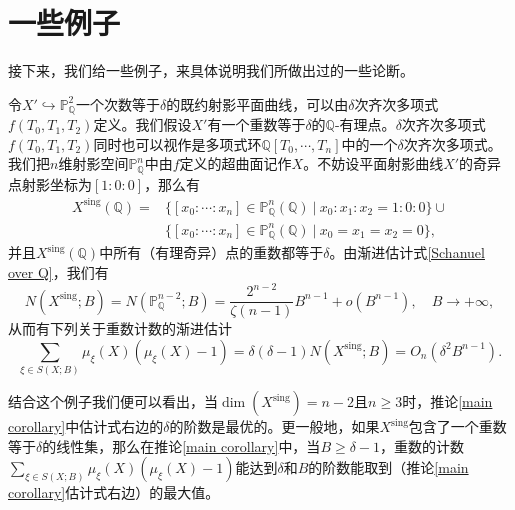 \section{一些例子}

接下来，我们给一些例子，来具体说明我们所做出过的一些论断。

\begin{example} \label{cylinder}
令$X'\hookrightarrow\mathbb P^2_{\mathbb{Q}}$一个次数等于$\delta$的既约射影平面曲线，可以由$\delta$次齐次多项式$f(T_0,T_1,T_2)$定义。我们假设$X'$有一个重数等于$\delta$的${\mathbb{Q}}$-有理点。$\delta$次齐次多项式$f(T_0,T_1,T_2)$同时也可以视作是多项式环${\mathbb{Q}}[T_0,\cdots,T_n]$中的一个$\delta$次齐次多项式。我们把$n$维射影空间$\mathbb P^n_{\mathbb{Q}}$中由$f$定义的超曲面记作$X$。不妨设平面射影曲线$X'$的奇异点射影坐标为$[1:0:0]$，那么有
\begin{align}
X^{\mathrm{sing}}(\mathbb{Q}) = & \{[x_0:\cdots:x_n] \in \mathbb{P}^n_{\mathbb{Q}}(\mathbb{Q}) \ |\ x_0:x_1:x_2 = 1:0:0 \} \cup \nonumber\\
& \{[x_0:\cdots:x_n] \in \mathbb{P}^n_{{\mathbb{Q}}}({\mathbb{Q}}) \ |\ x_0=x_1=x_2=0\},
\end{align}
并且$X^{\mathrm{sing}}(\mathbb{Q})$中所有（有理奇异）点的重数都等于$\delta$。由渐进估计式\eqref{Schanuel over Q}，我们有
\begin{equation}
N(X^{\mathrm{sing}};B) = N(\mathbb{P}^{n-2}_{\mathbb{Q}};B) = \frac{2^{n-2}}{\zeta(n-1)} B^{n-1} + o(B^{n-1}), \quad B \rightarrow +\infty,
\end{equation}
从而有下列关于重数计数的渐进估计
\begin{equation*}
\sum\limits_{\xi \in S(X;B)} \mu_\xi(X)(\mu_\xi(X)-1) = \delta(\delta-1) N(X^{\mathrm{sing}};B) = O_{n} \left( \delta^2 B^{n-1} \right).
\end{equation*}

结合这个例子我们便可以看出，当$\dim(X^\mathrm{sing}) = n-2$且$n \geqslant 3$时，推论\ref{main corollary}中估计式右边的$\delta$的阶数是最优的。更一般地，如果$X^\mathrm{sing}$包含了一个重数等于$\delta$的线性集，那么在推论\ref{main corollary}中，当$B \geqslant \delta-1$，重数的计数$\sum\limits_{\xi\in S(X;B)} \mu_\xi(X)(\mu_\xi(X)-1)$能达到$\delta$和$B$的阶数能取到（推论\ref{main corollary}估计式右边）的最大值。
\end{example}

